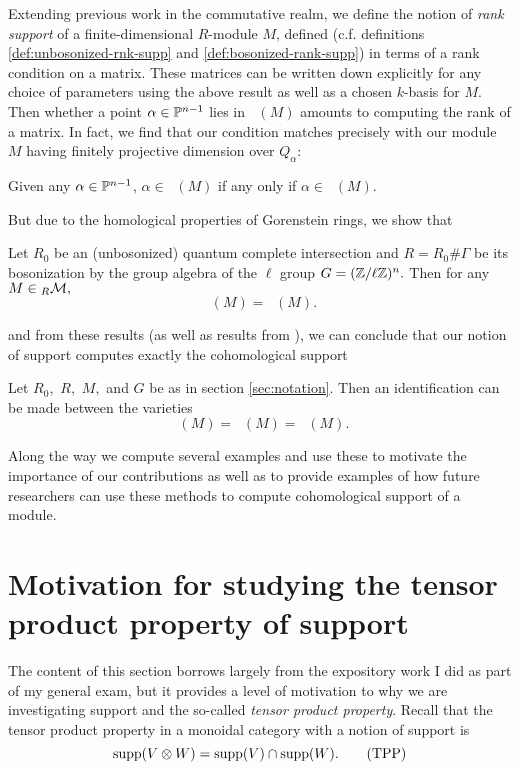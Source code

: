 \documentclass [11pt, proquest] {uwthesis}[2020/02/24]
\DeclareMathOperator{\supphR}{supp^\mathit{hyp}_R}
\DeclareMathOperator{\supphRnaught}{supp^\mathit{hyp}_{R_0}}
\DeclareMathOperator{\suppc}{supp^\mathit{coh}_R}
\DeclareMathOperator{\supprR}{supp^\mathit{rnk}_R}
\DeclareMathOperator{\supprRnaught}{supp^\mathit{rnk}_{R_0}}
\begin{document}
    Extending previous work in the commutative realm, we define the notion of \textit{rank support} of a finite-dimensional $R$-module $M$, defined (c.f. definitions \ref{def:unbosonized-rnk-supp} and \ref{def:bosonized-rank-supp}) in terms of a rank condition on a matrix. These matrices can be written down explicitly for any choice of parameters using the above result as well as a chosen $k$-basis for $M$. Then whether a point $\alpha\in\mathbb{P}^{n-1}$ lies in $\supprR(M)$ amounts to computing the rank of a matrix. In fact, we find that our condition matches precisely with our module $M$ having finitely projective dimension over $Q_\alpha$:
    \begingroup
    \def\thethm{3.10}
    \addtocounter{thm}{-1}
    \begin{thm} %
        Given any $\alpha\in\mathbb{P}^{n-1}$, $\alpha\in\supprRnaught(M)$ if any only if $\alpha\in \supphRnaught(M).$
    \end{thm}
    \endgroup
    But due to the homological properties of Gorenstein rings, we show that 
    \begingroup
    \def\thethm{6.8}
    \addtocounter{thm}{-1}
    \begin{thm}
        Let $R_0$ be an (unbosonized) quantum complete intersection and $R=R_0\#\Gamma$ be its bosonization by the group algebra of the $\ell$ group $G=(\mathbb{Z}/\ell\mathbb{Z})^n.$ Then for any $M\in{_R\mathcal{M}},$
        \[\supphR(M)=\supphRnaught(M).\]
    \end{thm}
    \endgroup
    \noindent and from these results (as well as results from \cite{negron-pevtsovaI}), we can conclude that our notion of support computes exactly the cohomological support
    \begingroup
    \def\thethm{6.9}
    \addtocounter{thm}{-1}
    \begin{thm}
        Let $R_0,$ $R,$ $M,$ and $G$ be as in section \ref{sec:notation}. Then an identification can be made between the varieties
        \[\suppc(M)=\supprR(M)=\supprRnaught(M).\]
    \end{thm}
    \endgroup
    
    Along the way we compute several examples and use these to motivate the importance of our contributions as well as to provide examples of how future researchers can use these methods to compute cohomological support of a module.

\section{Motivation for studying the tensor product property of support}
    The content of this section borrows largely from the expository work I did as part of my general exam, but it provides a level of motivation to why we are investigating support and the so-called \textit{tensor product property}. Recall that the tensor product property in a monoidal category with a notion of support is 
    \[\operatorname{supp}(V\otimes W)=\operatorname{supp}(V)\cap\operatorname{supp}(W).\label{eq:tensor-product-property} \tag{TPP}\]
    
\end{document}

